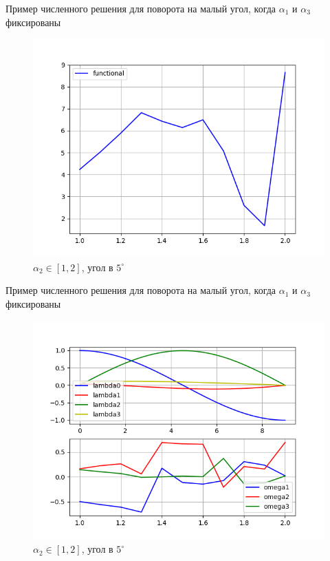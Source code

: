 \documentclass[10pt,utf8,presentation,notheorems,xcolor=dvipsnames,compress]{beamer}
\begin{document}
\begin{frame}{Пример численного решения для поворота на малый угол, когда $\alpha_1$ и $\alpha_3$ фиксированы}
\begin{figure}[H]
\center\includegraphics[scale=0.5]{fig/functional_alpha2_1-2_5.png}
\caption{$\alpha_2 \in [1, 2]$, угол в $5^{\circ}$}
\end{figure}
\end{frame}

\begin{frame}{Пример численного решения для поворота на малый угол, когда $\alpha_1$ и $\alpha_3$ фиксированы}
\begin{figure}[H]
\center\includegraphics[scale=0.5]{fig/ivp_and_control_alpha2_1-2_5.png}
\caption{$\alpha_2 \in [1, 2]$, угол в $5^{\circ}$}
\end{figure}
\end{frame}
\end{document}
